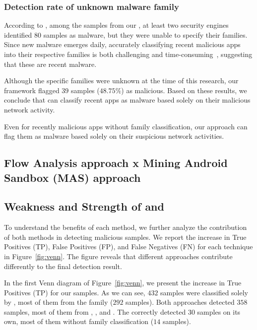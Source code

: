 \subsubsection{Detection rate of unknown malware family}\label{sec:unknowfamily}

According to \vt, among the samples from our \fds, at least two security engines identified $80$ samples as malware, but they were unable to specify their families. Since new malware emerges daily, accurately classifying recent malicious apps into their respective families is both challenging and time-consuming~\cite{DBLP:journals/compsec/WangTW21,DBLP:journals/compsec/ContiKP22}, suggesting that these are recent malware.

Although the specific families were unknown at the time of this research, our framework flagged $39$ samples ($48.75\%$) as malicious. Based on these results, we conclude that \droidxpflow can classify recent apps as malware based solely on their malicious network activity.

\begin{finding}

Even for recently malicious apps without family classification, our approach can flag them as malware based solely on their suspicious network activities.

\end{finding}



\subsection{Flow Analysis approach x Mining Android Sandbox (MAS) approach}\label{sec:new-mas-approach}



\subsection{Weakness and Strength of \net and \mas}\label{sec:strategy}

To understand the benefits of each method, we further analyze the contribution of both methods in detecting malicious samples. We report the increase in True Positives (TP), False Positives (FP), and False Negatives (FN) for each technique in Figure~\ref{fig:venn}. The figure reveals that different approaches contribute differently to the final detection result.

In the first Venn diagram of Figure~\ref{fig:venn}, we present the increase in True Positives (TP) for our samples. As we can see, $432$ samples were classified solely by \droidxpflow, most of them from the \gps family ($292$ samples). Both approaches detected $358$ samples, most of them from \gps, , and \dwg. The \mas correctly detected $30$ samples on its own, most of them without family classification ($14$ samples).

